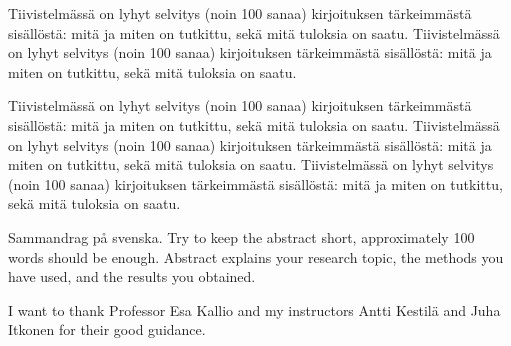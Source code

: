 \documentclass[english,12pt,a4paper,pdftex,elec,utf8]{aaltothesis}
\begin{document}
\newpage
%
\begin{abstractpage}[finnish]
  Tiivistelmässä on lyhyt selvitys (noin 100 sanaa)
  kirjoituksen tärkeimmästä sisällöstä: mitä ja miten on tutkittu,
  sekä mitä tuloksia on saatu. 
  Tiivistelmässä on lyhyt selvitys (noin 100 sanaa)
  kirjoituksen tärkeimmästä sisällöstä: mitä ja miten on tutkittu,
  sekä mitä tuloksia on saatu. 

  Tiivistelmässä on lyhyt selvitys (noin 100 sanaa)
  kirjoituksen tärkeimmästä sisällöstä: mitä ja miten on tutkittu,
  sekä mitä tuloksia on saatu. 
  Tiivistelmässä on lyhyt selvitys (noin 100 sanaa)
  kirjoituksen tärkeimmästä sisällöstä: mitä ja miten on tutkittu,
  sekä mitä tuloksia on saatu. 
  Tiivistelmässä on lyhyt selvitys (noin 100 sanaa)
  kirjoituksen tärkeimmästä sisällöstä: mitä ja miten on tutkittu,
  sekä mitä tuloksia on saatu. 
\end{abstractpage}

\newpage
%
%
\begin{abstractpage}[swedish]
 Sammandrag p\aa{} svenska.
 Try to keep the abstract short, approximately 
 100 words should be enough. Abstract explains your research topic, 
 the methods you have used, and the results you obtained.  
\end{abstractpage}

I want to thank Professor Esa Kallio
and my instructors Antti Kestilä and Juha Itkonen for their 
good guidance.\\
\end{document}
